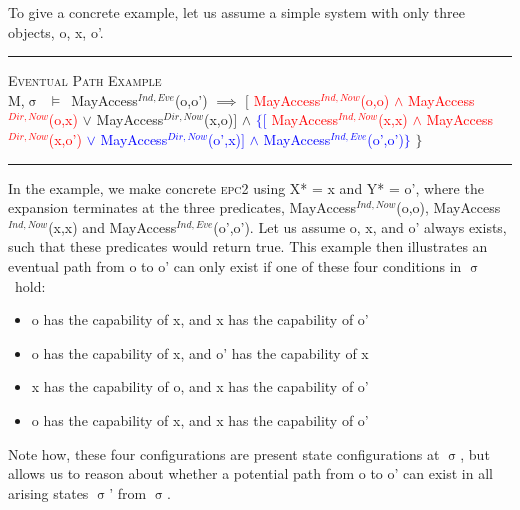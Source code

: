 \documentclass[a4paper,11pt, twoside,twocolumn]{article}
\newenvironment{logic}[1][]
{\begin{flushleft} \small }
{\end{flushleft}}
\newcommand{\loand}{$\land$}
\newcommand{\loor} {$\lor$}
\newcommand{\loimplies}{$\implies$}
\newcommand{\losigma}{$\upsigma$}
\newcommand{\loturns} {$\vDash$}
\newcommand{\ablock} {\null\qquad}
\begin{document}
To give a concrete example, let us assume a simple system with only three objects, o, x, o'.
\begin{logic}
\hrule\null
\textsc{\normalsize *Eventual Path Example}\\
M,\losigma\ \loturns\ MayAccess$^{Ind,Eve}$(o,o')\linebreak
\ablock \loimplies\linebreak
\ablock \ablock $[$\null
\textcolor{red}{MayAccess$^{Ind,Now}$(o,o) \loand\linebreak
\ablock \ablock \quad MayAccess$^{Dir,Now}$(o,x)\linebreak
}
\ablock \ablock \quad \loor \linebreak
\ablock \ablock MayAccess$^{Dir,Now}$(x,o)$ ]$\linebreak
\ablock \ablock \loand \linebreak
\textcolor{blue}{
\ablock \ablock $\{[$
\textcolor{red}{MayAccess$^{Ind,Now}$(x,x) \loand\linebreak
\ablock \ablock \quad MayAccess$^{Dir,Now}$(x,o')\linebreak}
\ablock \ablock \quad \quad \loor \linebreak
\ablock \ablock \quad MayAccess$^{Dir,Now}$(o',x)$]$\linebreak
\ablock \ablock \quad \loand \linebreak
\ablock \ablock \quad MayAccess$^{Ind,Eve}$(o',o')$\}$
}\linebreak
\ablock \ablock $\}$
\linebreak \\
\hrule
\end{logic}
In the example, we make concrete \textsc{epc2} using X* = x and Y* = o', where the expansion terminates at the three predicates, MayAccess$^{Ind,Now}$(o,o), MayAccess$^{Ind,Now}$(x,x) and MayAccess$^{Ind,Eve}$(o',o'). Let us assume o, x, and o' always exists, such that these predicates would return true. This example then illustrates an eventual path from o to o' can only exist if one of these four conditions in \losigma\ hold:
\begin{itemize}\setlength\itemsep{0.5em}
\item o has the capability of x, and x has the capability of o'
\item o has the capability of x, and o' has the capability of x
\item x has the capability of o, and x has the capability of o'
\item o has the capability of x, and x has the capability of o'
\end{itemize}
Note how, these four configurations are present state configurations at \losigma, but allows us to reason about whether a potential path from o to o' can exist in all arising states \losigma' from \losigma.\\
\end{document}
